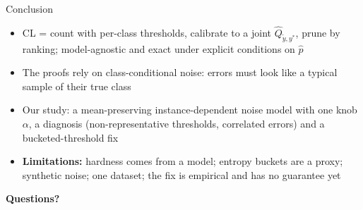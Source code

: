 \documentclass[aspectratio=169,10pt]{beamer}
\begin{document}
\begin{frame}{Conclusion}
  \begin{itemize}
    \item CL = \alert{count} with per-class thresholds, \alert{calibrate} to a joint $\hat Q_{\tilde y,y^*}$, \alert{prune} by ranking; model-agnostic and exact under explicit conditions on $\hat p$
    \item The proofs rely on class-conditional noise: errors must look like a typical sample of their true class
    \item Our study: a mean-preserving instance-dependent noise model with one knob $\alpha$, a diagnosis (non-representative thresholds, correlated errors) and a bucketed-threshold fix
    \item \textbf{Limitations:} hardness comes from a model; entropy buckets are a proxy; synthetic noise; one dataset; the fix is empirical and has no guarantee yet
  \end{itemize}
  \vspace{6pt}
  \centering\textbf{Questions?}
\end{frame}
\end{document}
